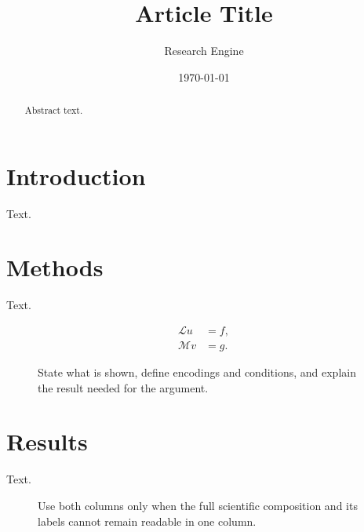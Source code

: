 \documentclass[aps,prl,reprint,superscriptaddress,nofootinbib,longbibliography]{revtex4-2}
\theoremstyle{definition}
\theoremstyle{remark}
\begin{document}
\title{Article Title}

\author{Research Engine}
\noaffiliation

\date{\today}

\begin{abstract}
Abstract text.
\end{abstract}

\maketitle

\section{Introduction}

Text.

\section{Methods}

Text.

\begin{equation}
  \begin{aligned}
    \mathcal{L}u &= f, \\
    \mathcal{M}v &= g .
  \end{aligned}
  \label{eq:column-example}
\end{equation}

\begin{figure}[t]
  \centering
  \fbox{\rule{0pt}{1.25in}\rule{0.88\columnwidth}{0pt}}
  \caption{State what is shown, define encodings and conditions, and explain the
  result needed for the argument.\label{fig:single-column}}
\end{figure}

\section{Results}

Text.

\begin{figure}[t]
  \centering
  \fbox{\rule{0pt}{1.55in}\rule{0.96\textwidth}{0pt}}
  \caption{Use both columns only when the full scientific composition and its
  labels cannot remain readable in one column.\label{fig:two-column}}
\end{figure}
\end{document}
